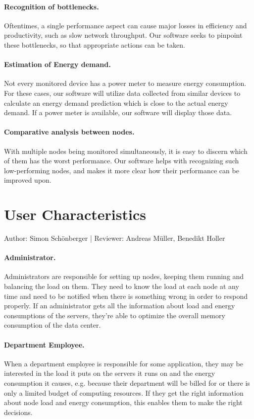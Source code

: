 \documentclass{scrreprt}
\begin{document}
\paragraph{Recognition of bottlenecks.}
Oftentimes, a single performance aspect can cause major losses in efficiency and productivity, such as slow network throughput. Our software seeks to pinpoint these bottlenecks, so that appropriate actions can be taken.
\paragraph{Estimation of Energy demand.}
Not every monitored device has a power meter to measure energy consumption. For these cases, our software will utilize data collected from similar devices to calculate an energy demand prediction which is close to the actual energy demand. If a power meter is available, our software will display those data.
\paragraph{Comparative analysis between nodes.}
With multiple nodes being monitored simultaneously, it is easy to discern which of them has the worst performance. Our software helps with recognizing such low-performing nodes, and makes it more clear how their performance can be improved upon.



\section{User Characteristics}
Author:  Simon Sch\"onberger |
Reviewer: Andreas M\"uller, Benedikt Holler
\paragraph{Administrator.} Administrators are responsible for setting up
nodes, keeping them running and balancing the load on them. They need to know the load at each node at any time and need to be notified when there is something wrong in order to respond properly. If an administrator gets all the information about load and energy consumptions of the servers, they're able to optimize the overall memory consumption
of the data center.

\paragraph{Department Employee.} When a department employee is responsible for some application,
they may be interested in the load it puts on the servers it runs on and the energy consumption
it causes, e.g. because their department will be billed for or there is only a limited
budget of computing resources. If they get the right information about node load and 
energy consumption, this enables them to make the right decisions.
\end{document}
